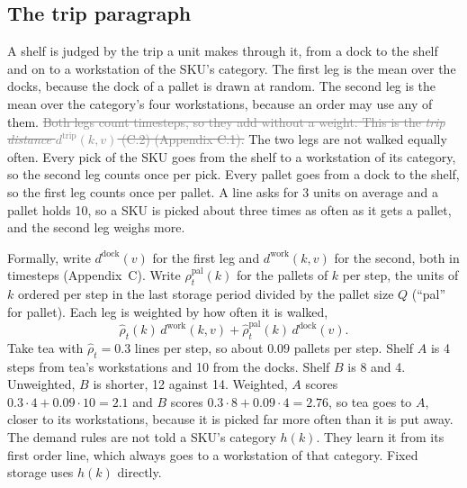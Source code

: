 \documentclass[11pt,a4paper]{article}
\newcommand{\old}[1]{\textcolor{gray}{\sout{#1}}}
\newenvironment{greenblock}{\color{newc}}{}
\begin{document}
\subsection*{The trip paragraph}
A shelf is judged by the trip a unit makes through it, from a dock to the
shelf and on to a workstation of the SKU's category. The first leg is the
mean over the docks, because the dock of a pallet is drawn at random. The
second leg is the mean over the category's four workstations, because an
order may use any of them.
\old{Both legs count timesteps, so they add without a weight. This is the
\emph{trip distance} $d^{\mathrm{trip}}(k,v)$ (C.2) (Appendix C.1).}
\begin{greenblock}
The two legs are not walked equally often. Every pick of the SKU goes from
the shelf to a workstation of its category, so the second leg counts once per
pick. Every pallet goes from a dock to the shelf, so the first leg counts once
per pallet. A line asks for 3 units on average and a pallet holds 10, so a
SKU is picked about three times as often as it gets a pallet, and the second
leg weighs more.

Formally, write $d^{\mathrm{dock}}(v)$ for the first leg and
$d^{\mathrm{work}}(k,v)$ for the second, both in timesteps (Appendix~C).
Write $\hat\rho^{\mathrm{pal}}_t(k)$ for the pallets of $k$ per step, the
units of $k$ ordered per step in the last storage period divided by the
pallet size $Q$ (``pal'' for pallet). Each leg is weighted by how often it is
walked,
\begin{equation*}
  \hat\rho_t(k)\, d^{\mathrm{work}}(k,v) + \hat\rho^{\mathrm{pal}}_t(k)\, d^{\mathrm{dock}}(v) .
\end{equation*}
Take tea with $\hat\rho_t = 0.3$ lines per step, so about $0.09$ pallets per
step. Shelf $A$ is 4 steps from tea's workstations and 10 from the docks.
Shelf $B$ is 8 and 4. Unweighted, $B$ is shorter, 12 against 14. Weighted,
$A$ scores $0.3\cdot4+0.09\cdot10=2.1$ and $B$ scores
$0.3\cdot8+0.09\cdot4=2.76$, so tea goes to $A$, closer to its workstations,
because it is picked far more often than it is put away.
\end{greenblock}
The demand rules are not told a SKU's category $h(k)$. They learn it from
its first order line, which always goes to a workstation of that category.
Fixed storage uses $h(k)$ directly.
\end{document}
